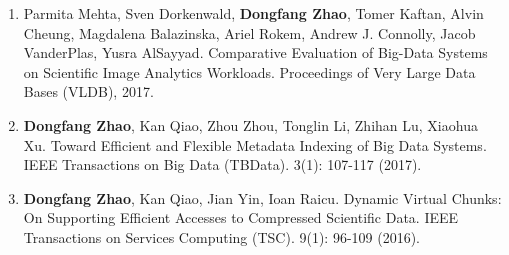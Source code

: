 \documentclass[11pt]{scrartcl}
\begin{document}
\begin{enumerate}


\item Parmita Mehta, Sven Dorkenwald, \textbf{Dongfang Zhao}, Tomer Kaftan, Alvin Cheung, Magdalena Balazinska, Ariel Rokem, Andrew J. Connolly, Jacob VanderPlas, Yusra AlSayyad.
Comparative Evaluation of Big-Data Systems on Scientific Image Analytics Workloads. 
Proceedings of Very Large Data Bases (VLDB), 2017.

\item \textbf{Dongfang Zhao}, Kan Qiao, Zhou Zhou, Tonglin Li, Zhihan Lu, Xiaohua Xu.
Toward Efficient and Flexible Metadata Indexing of Big Data Systems. IEEE Transactions on Big Data (TBData). 3(1): 107-117 (2017).





\item \textbf{Dongfang Zhao}, Kan Qiao, Jian Yin, Ioan Raicu.
Dynamic Virtual Chunks: On Supporting Efficient Accesses to Compressed Scientific Data. IEEE Transactions on Services Computing (TSC). 9(1): 96-109 (2016).


\end{enumerate}
\end{document}
